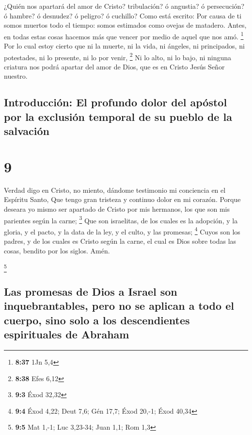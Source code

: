  ¿Quién nos apartará del amor de Cristo? tribulación? ó
angustia? ó persecución? ó hambre? ó desnudez? ó peligro? ó cuchillo?
 Como está escrito: Por causa de ti somos muertos todo el
tiempo: somos estimados como ovejas de matadero.  Antes,
en todas estas cosas hacemos más que vencer por medio de aquel que nos
amó. \footnote{\textbf{8:37} 1Jn 5,4}  Por lo cual estoy
cierto que ni la muerte, ni la vida, ni ángeles, ni principados, ni
potestades, ni lo presente, ni lo por venir, \footnote{\textbf{8:38}
  Efes 6,12}  Ni lo alto, ni lo bajo, ni ninguna criatura
nos podrá apartar del amor de Dios, que es en Cristo Jesús Señor
nuestro.

\hypertarget{introducciuxf3n-el-profundo-dolor-del-apuxf3stol-por-la-exclusiuxf3n-temporal-de-su-pueblo-de-la-salvaciuxf3n}{%
\subsection{Introducción: El profundo dolor del apóstol por la exclusión
temporal de su pueblo de la
salvación}\label{introducciuxf3n-el-profundo-dolor-del-apuxf3stol-por-la-exclusiuxf3n-temporal-de-su-pueblo-de-la-salvaciuxf3n}}

\hypertarget{section-8}{%
\section{9}\label{section-8}}

 Verdad digo en Cristo, no miento, dándome testimonio mi
conciencia en el Espíritu Santo,  Que tengo gran tristeza
y continuo dolor en mi corazón.  Porque deseara yo mismo
ser apartado de Cristo por mis hermanos, los que son mis parientes según
la carne; \footnote{\textbf{9:3} Éxod 32,32}  Que son
israelitas, de los cuales es la adopción, y la gloria, y el pacto, y la
data de la ley, y el culto, y las promesas; \footnote{\textbf{9:4} Éxod
  4,22; Deut 7,6; Gén 17,7; Éxod 20,-1; Éxod 40,34}  Cuyos
son los padres, y de los cuales es Cristo según la carne, el cual es
Dios sobre todas las cosas, bendito por los siglos. Amén.

\footnote{\textbf{9:5} Mat 1,-1; Luc 3,23-34; Juan 1,1; Rom 1,3}

\hypertarget{las-promesas-de-dios-a-israel-son-inquebrantables-pero-no-se-aplican-a-todo-el-cuerpo-sino-solo-a-los-descendientes-espirituales-de-abraham}{%
\subsection{Las promesas de Dios a Israel son inquebrantables, pero no
se aplican a todo el cuerpo, sino solo a los descendientes espirituales
de
Abraham}\label{las-promesas-de-dios-a-israel-son-inquebrantables-pero-no-se-aplican-a-todo-el-cuerpo-sino-solo-a-los-descendientes-espirituales-de-abraham}}

